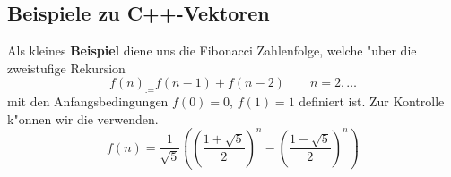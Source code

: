\subsection{Beispiele zu C++-Vektoren}
\label{p:5.1.3}
%
Als kleines \textbf{Beispiel} diene uns die Fibonacci Zahlenfolge,
welche "uber die zweistufige Rekursion
$$
f(n) _:= f(n-1) + f(n-2) \qquad n=2,\ldots
$$
mit den Anfangsbedingungen $f(0) = 0$, $f(1) = 1$ definiert ist.
Zur Kontrolle k"onnen wir die
verwenden.
$$
f(n) = \frac{1}{\sqrt{5}}
 \left( \left(\frac{1+\sqrt{5}}{2}\right)^n
      - \left(\frac{1-\sqrt{5}}{2}\right)^n
 \right)
$$
%
%

